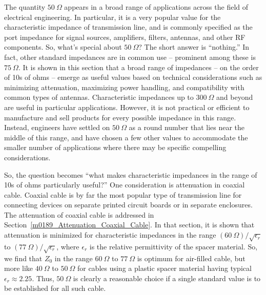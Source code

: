 

\label{m0191_Why_50_Ohms} %

The quantity $50~\Omega$ appears in a broad range of applications across the field of electrical engineering.
In particular, it is a very popular value for the characteristic impedance of transmission line, and is commonly specified as the port impedance for signal sources, amplifiers, filters, antennas, and other RF components. 
So, what's special about $50~\Omega$?
The short answer is ``nothing.''
In fact, other standard impedances are in common use -- prominent among these is $75~\Omega$.
It is shown in this section that a broad range of impedances -- on the order of 10s of ohms -- emerge as useful values based on technical considerations such as minimizing attenuation, maximizing power handling, and compatibility with common types of antennas.
Characteristic impedances up to $300~\Omega$ and beyond are useful in particular applications.
However, it is not practical or efficient to manufacture and sell products for every possible impedance in this range.
Instead, engineers have settled on $50~\Omega$ as a round number that lies near the middle of this range, and have chosen a few other values to accommodate the smaller number of applications where there may be specific compelling considerations.
 
So, the question becomes ``what makes characteristic impedances in the range of 10s of ohms particularly useful?''
One consideration is attenuation 
in coaxial cable.  
Coaxial cable is by far the most popular type of transmission line for connecting devices on separate printed circuit boards or in separate enclosures.
The attenuation of coaxial cable is addressed in Section~\ref{m0189_Attenuation_Coaxial_Cable}.
In that section, it is shown that attenuation is minimized for characteristic impedances in the range $\left(60~\Omega\right)/\sqrt{\epsilon_r}$ to 
$\left(77~\Omega\right)/\sqrt{\epsilon_r}$, where $\epsilon_r$ is the relative permittivity of the spacer material.
So, we find that $Z_0$ in the range $60~\Omega$ to $77~\Omega$ is optimum for air-filled cable, but more like $40~\Omega$ to $50~\Omega$ for cables using a plastic spacer material having typical $\epsilon_r\approx 2.25$.
Thus, $50~\Omega$ is clearly a reasonable choice if a single standard value is to be established for all such cable.
   
